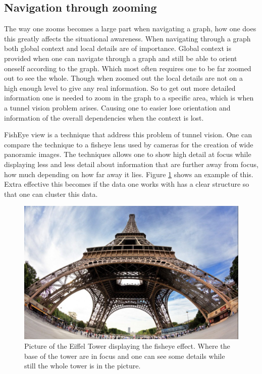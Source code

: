 \documentclass[a4paper,11pt]{kth-mag}
\begin{document}
\subsection{Navigation through zooming}
The way one zooms becomes a large part when navigating a graph, how one does this greatly affects the situational awareness. When navigating through a graph both global context and local details are of importance. Global context
is provided when one can navigate through a graph and still be able to orient oneself according to the graph. Which most often requires one to be far zoomed out to see the whole. Though when zoomed out the local details are not 
on a high enough level to give any real information. So to get out more detailed information one is needed to zoom in the graph to a specific area, which is when a tunnel vision problem arises. 
Causing one to easier lose orientation and information of the overall dependencies when the context is lost.

FishEye view is a technique that address this problem of tunnel vision. One can compare the technique to a fisheye lens used by cameras for the creation of wide panoramic images. The techniques allows one to show high detail
at focus while displaying less and less detail about information that are further away from focus, how much depending on how far away it lies. Figure \ref{fig:FishEye} shows an example of this. Extra effective this becomes if the data one works with has a clear structure so
that one can cluster this data.

\begin{figure}[!htbp]
	\centering
	\includegraphics[scale=0.3]{FishEyeEiffel}
	\caption{Picture of the Eiffel Tower displaying the fisheye effect. Where the base of the tower are in focus and one can see some details while still the whole tower is in the picture.}
	\label{fig:FishEye}
\end{figure}
\end{document}
